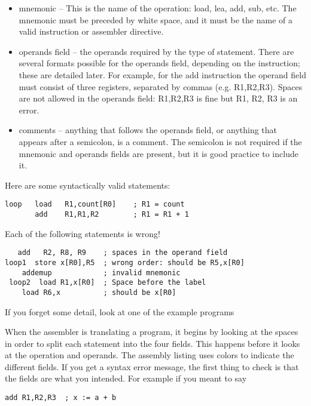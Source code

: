 \documentclass[11pt]{article}
\begin{document}
\begin{itemize}
\begin{itemize}
\item mnemonic -- This is the name of the operation: load, lea, add, sub,
etc.  The mnemonic must be preceded by white space, and it must be
the name of a valid instruction or assembler directive.

\item operands field -- the operands required by the type of statement.
There are several formats possible for the operands field, depending
on the instruction; these are detailed later.  For example, for the
add instruction the operand field must consist of three registers,
separated by commas (e.g. R1,R2,R3).  Spaces are not allowed in the
operands field: R1,R2,R3 is fine but R1, R2, R3 is an error.

\item comments -- anything that follows the operands field, or anything
that appears after a semicolon, is a comment.  The semicolon is not
required if the mnemonic and operands fields are present, but it is
good practice to include it.
\end{itemize}

Here are some syntactically valid statements:
\begin{verbatim}
loop   load   R1,count[R0]    ; R1 = count
       add    R1,R1,R2        ; R1 = R1 + 1
\end{verbatim}

Each of the following statements is wrong!

\begin{verbatim}
   add   R2, R8, R9    ; spaces in the operand field
loop1  store x[R0],R5  ; wrong order: should be R5,x[R0]
    addemup            ; invalid mnemonic
 loop2  load R1,x[R0]  ; Space before the label
    load R6,x          ; should be x[R0]
\end{verbatim}

If you forget some detail, look at one of the example programs

When the assembler is translating a program, it begins by looking at
the spaces in order to split each statement into the four fields.
This happens before it looks at the operation and operands.  The
assembly listing uses colors to indicate the different fields.  If you
get a syntax error message, the first thing to check is that the
fields are what you intended.  For example if you meant to say

\begin{verbatim}
add R1,R2,R3  ; x := a + b
\end{verbatim}


\end{itemize}
\end{document}
